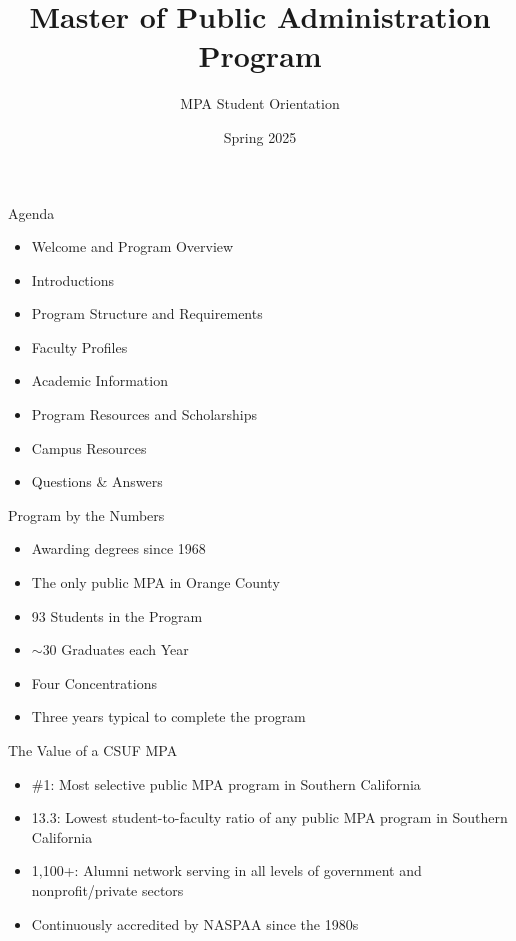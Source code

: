 \documentclass[10pt]{beamer}
\begin{document}
\title{Master of Public Administration Program}
\subtitle{MPA Student Orientation}
\date{Spring 2025}
\vspace{1cm}

\maketitle

\begin{frame}{Agenda}
\begin{itemize}
\item Welcome and Program Overview
\item Introductions
\item Program Structure and Requirements
\item Faculty Profiles
\item Academic Information
\item Program Resources and Scholarships
\item Campus Resources
\item Questions \& Answers
\end{itemize}
\end{frame}

\begin{frame}{Program by the Numbers}
\begin{itemize}
\item Awarding degrees since 1968
\item The only public MPA in Orange County
\item 93 Students in the Program
\item $\sim$30 Graduates each Year
\item Four Concentrations
\item Three years typical to complete the program
\end{itemize}
\end{frame}

\begin{frame}{The Value of a CSUF MPA}
\begin{itemize}
\item \#1: Most selective public MPA program in Southern California
\item 13.3: Lowest student-to-faculty ratio of any public MPA program in Southern California
\item 1,100+: Alumni network serving in all levels of government and nonprofit/private sectors
\item Continuously accredited by NASPAA since the 1980s
\end{itemize}
\end{frame}
\end{document}
